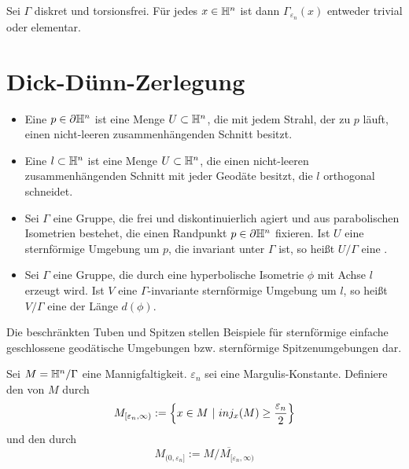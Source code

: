 \documentclass{book}
\renewcommand{\epsilon}{\varepsilon}
\begin{document}
\Kor{}
Sei $\Gamma$ diskret und torsionsfrei. Für jedes $x\in \mathbb{H}^n$ ist dann $\Gamma_{\epsilon_n}(x)$ entweder trivial oder elementar.

\section{Dick-Dünn-Zerlegung}

\Def{}
\begin{itemize}
	\item Eine  $p \in \partial\mathbb{H}^n$ ist eine Menge $U \subset \mathbb{H}^n$, die mit jedem Strahl, der zu $p$ läuft, einen nicht-leeren zusammenhängenden Schnitt besitzt.
	\item Eine  $l \subset \mathbb{H}^n$ ist eine Menge $U \subset \mathbb{H}^n$, die einen nicht-leeren zusammenhängenden Schnitt mit jeder Geodäte besitzt, die $l$ orthogonal schneidet.
	\item Sei $\Gamma$ eine Gruppe, die frei und diskontinuierlich agiert und aus parabolischen Isometrien bestehet, die einen Randpunkt $p\in \partial\mathbb{H}^n$ fixieren. Ist $U$ eine sternförmige Umgebung um $p$, die invariant unter $\Gamma$ ist, so heißt $U / \Gamma$ eine .
	\item Sei $\Gamma$ eine Gruppe, die durch eine hyperbolische Isometrie $\phi$ mit Achse $l$ erzeugt wird. Ist $V$ eine $\Gamma$-invariante sternförmige Umgebung um $l$, so heißt $V / \Gamma$ eine  der Länge $d(\phi)$.
\end{itemize}
\Bem{}
Die beschränkten Tuben und Spitzen stellen Beispiele für sternförmige einfache geschlossene geodätische Umgebungen bzw. sternförmige Spitzenumgebungen dar.

\newcommand{\thick}{M_{[\epsilon_n, \infty)}}
\newcommand{\thin}{M_{(0,\epsilon_n]}}
\Def{}
Sei $M = \mathbb{H}^n / \Gamma$ eine Mannigfaltigkeit. $\epsilon_n$ sei eine Margulis-Konstante. Definiere den  von $M$ durch
\[ \thick := \set{ x \in M }{inj_x(M) \geq \frac{\epsilon_n}{2}} \]
und den  durch
\[ \thin := \overline{ M/\thick } \]
\end{document}
